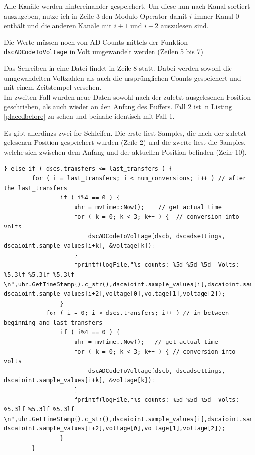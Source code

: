 \documentclass[12pt,a4paper]{scrartcl}
\begin{document}
Alle Kanäle werden hintereinander gespeichert. Um diese nun nach Kanal sortiert auszugeben, nutze ich in Zeile 3 den Modulo Operator damit $i$ immer Kanal 0 enthält und die anderen Kanäle mit $i+1$ und $i+2$ auszulesen sind.

Die Werte müssen noch von AD-Counts mittels der Funktion \texttt{dscADCodeToVoltage} in Volt umgewandelt werden (Zeilen 5 bis 7).

Das Schreiben in eine Datei findet in Zeile 8 statt. Dabei werden sowohl die umgewandelten Voltzahlen als auch die ursprünglichen Counts gespeichert und mit einem Zeitstempel versehen. \\

Im zweiten Fall wurden neue Daten sowohl nach der zuletzt ausgelesenen Position geschrieben, als auch wieder an den Anfang des Buffers. Fall 2 ist in Listing \ref{placedbefore} zu sehen und beinahe identisch mit Fall 1. 

Es gibt allerdings zwei for Schleifen. Die erste liest Samples, die nach der zuletzt gelesenen Position gespeichert wurden (Zeile 2) und die zweite liest die Samples, welche sich zwischen dem Anfang und der aktuellen Position befinden (Zeile 10).
					
\begin{lstlisting}[frame=trBL]				
	} else if ( dscs.transfers <= last_transfers ) {
		for ( i = last_transfers; i < num_conversions; i++ ) // after the last_transfers
				if ( i%4 == 0 ) {
					uhr = mvTime::Now();    // get actual time
					for ( k = 0; k < 3; k++ ) {  // conversion into volts
						dscADCodeToVoltage(dscb, dscadsettings, dscaioint.sample_values[i+k], &voltage[k]);
					}
					fprintf(logFile,"%s counts: %5d %5d %5d  Volts: %5.3lf %5.3lf %5.3lf \n",uhr.GetTimeStamp().c_str(),dscaioint.sample_values[i],dscaioint.sample_values[i+1], dscaioint.sample_values[i+2],voltage[0],voltage[1],voltage[2]);
				}
            for ( i = 0; i < dscs.transfers; i++ ) // in between beginning and last transfers
				if ( i%4 == 0 ) {
					uhr = mvTime::Now();   // get actual time
					for ( k = 0; k < 3; k++ ) { // conversion into volts
						dscADCodeToVoltage(dscb, dscadsettings, dscaioint.sample_values[i+k], &voltage[k]);
					}
					fprintf(logFile,"%s counts: %5d %5d %5d  Volts: %5.3lf %5.3lf %5.3lf \n",uhr.GetTimeStamp().c_str(),dscaioint.sample_values[i],dscaioint.sample_values[i+1], dscaioint.sample_values[i+2],voltage[0],voltage[1],voltage[2]);
				}
        }
\end{lstlisting}
\end{document}

